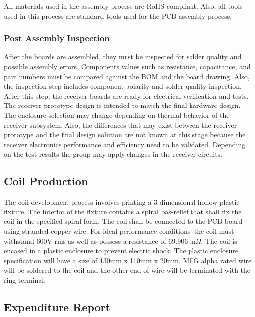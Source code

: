 \documentclass[12pt]{article}
\begin{document}
 \noindent
All materials used in the assembly process are  RoHS compliant. Also, all tools used in this process are standard tools used for the PCB assembly process.
 
 \subsubsection{Post Assembly Inspection}

\indent
After the boards are assembled, they must be inspected for solder quality and possible assembly errors. Components values such as resistance, capacitance, and part numbers must be compared against the BOM and the board drawing. Also, the inspection step includes component polarity and solder quality inspection. After this step, the receiver boards are ready for electrical verification and tests.\\
 
 \indent
The receiver prototype design is intended to match the final hardware design. The enclosure selection may change depending on thermal behavior of the receiver subsystem. Also, the differences that may exist between the receiver prototype and the final design solution are not known at this stage because the receiver electronics performance and efficiency need to be validated. Depending on the test results the group may apply changes in the receiver circuits.
\hfill
\pagebreak

\subsection{Coil Production}

\indent \indent
The coil development process involves printing a 3-dimensional hollow plastic fixture. The interior of the fixture contains a spiral bas-relief that shall fix the coil in the specified spiral form. The coil shall be connected to the PCB board using stranded copper wire. For ideal performance conditions, the coil must withstand 600V rms as well as possess a resistance of 69.906 m$\Omega$. The coil is encased in a plastic enclosure to prevent electric shock. The plastic enclosure specification will have a size of 130mm x 110mm x 20mm. MFG alpha rated wire will be soldered to the coil and the other end of wire will be terminated with the ring terminal.  

\subsection{Expenditure Report}
\end{document}

